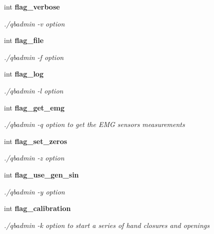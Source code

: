 \begin{DoxyCompactItemize}
\mbox{\label{structglobal__args_a2d410324c656ed3cf62239ef07f19df6}} 
int \textbf{ flag\+\_\+verbose}
\begin{DoxyCompactList}\small\item\em ./qbadmin -\/v option \end{DoxyCompactList}\item 
\mbox{\label{structglobal__args_afc413e6af53fa6f9942e91061ec9b1f7}} 
int \textbf{ flag\+\_\+file}
\begin{DoxyCompactList}\small\item\em ./qbadmin -\/f option \end{DoxyCompactList}\item 
\mbox{\label{structglobal__args_a86b9e5670875a9a7e17f30b62e988d89}} 
int \textbf{ flag\+\_\+log}
\begin{DoxyCompactList}\small\item\em ./qbadmin -\/l option \end{DoxyCompactList}\item 
\mbox{\label{structglobal__args_a1e27bdb894b1a7eb6221b1bd463dc71d}} 
int \textbf{ flag\+\_\+get\+\_\+emg}
\begin{DoxyCompactList}\small\item\em ./qbadmin -\/q option to get the E\+MG sensors measurements \end{DoxyCompactList}\item 
\mbox{\label{structglobal__args_a66d5c9e9750727f229d685d9399218d0}} 
int \textbf{ flag\+\_\+set\+\_\+zeros}
\begin{DoxyCompactList}\small\item\em ./qbadmin -\/z option \end{DoxyCompactList}\item 
\mbox{\label{structglobal__args_a976efe8621136ad8b129e72d53be6705}} 
int \textbf{ flag\+\_\+use\+\_\+gen\+\_\+sin}
\begin{DoxyCompactList}\small\item\em ./qbadmin -\/y option \end{DoxyCompactList}\item 
\mbox{\label{structglobal__args_ada343d7375a97b92b74f21ff14998520}} 
int \textbf{ flag\+\_\+calibration}
\begin{DoxyCompactList}\small\item\em ./qbadmin -\/k option to start a series of hand closures and openings \end{DoxyCompactList}\item 
\mbox{\label{structglobal__args_a884582f66057291a6a1f030d5d46d9d5}} 

\end{DoxyCompactItemize}
